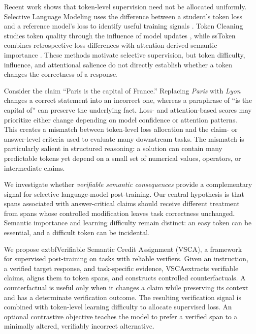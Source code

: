 \documentclass{article}
\newcommand{\vsca}{\textsc{VSCA}}
\begin{document}
Recent work shows that token-level supervision need not be allocated uniformly. Selective Language Modeling uses the difference between a student's token loss and a reference model's loss to identify useful training signals \citep{rho1}. Token Cleaning studies token quality through the influence of model updates \citep{tokenCleaning}, while ssToken combines retrospective loss differences with attention-derived semantic importance \citep{ssToken}. These methods motivate selective supervision, but token difficulty, influence, and attentional salience do not directly establish whether a token changes the correctness of a response.

Consider the claim ``Paris is the capital of France.'' Replacing \emph{Paris} with \emph{Lyon} changes a correct statement into an incorrect one, whereas a paraphrase of ``is the capital of'' can preserve the underlying fact. Loss- and attention-based scores may prioritize either change depending on model confidence or attention patterns. This creates a mismatch between token-level loss allocation and the claim- or answer-level criteria used to evaluate many downstream tasks. The mismatch is particularly salient in structured reasoning: a solution can contain many predictable tokens yet depend on a small set of numerical values, operators, or intermediate claims.

We investigate whether \emph{verifiable semantic consequences} provide a complementary signal for selective language-model post-training. Our central hypothesis is that spans associated with answer-critical claims should receive different treatment from spans whose controlled modification leaves task correctness unchanged. Semantic importance and learning difficulty remain distinct: an easy token can be essential, and a difficult token can be incidental.

We propose 	extbf{Verifiable Semantic Credit Assignment} (\vsca), a framework for supervised post-training on tasks with reliable verifiers. Given an instruction, a verified target response, and task-specific evidence, \vsca extracts verifiable claims, aligns them to token spans, and constructs controlled counterfactuals. A counterfactual is useful only when it changes a claim while preserving its context and has a determinate verification outcome. The resulting verification signal is combined with token-level learning difficulty to allocate supervised loss. An optional contrastive objective teaches the model to prefer a verified span to a minimally altered, verifiably incorrect alternative.
\end{document}
